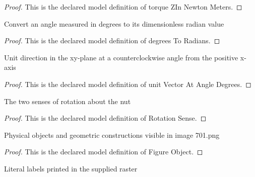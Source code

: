 \begin{proof}
  This is the declared model definition of torque ZIn Newton Meters.
\end{proof}
\begin{definition}
  \label{def:physics:phyx-mini-0701:phyxminiproblems-problemphyxmini0701-degreestoradians}
  Convert an angle measured in degrees to its dimensionless radian value
\end{definition}
\begin{proof}
  This is the declared model definition of degrees To Radians.
\end{proof}
\begin{definition}
  \label{def:physics:phyx-mini-0701:phyxminiproblems-problemphyxmini0701-unitvectoratangledegrees}
  Unit direction in the xy-plane at a counterclockwise angle from the positive x-axis
\end{definition}
\begin{proof}
  This is the declared model definition of unit Vector At Angle Degrees.
\end{proof}
\begin{definition}
  \label{def:physics:phyx-mini-0701:phyxminiproblems-problemphyxmini0701-rotationsense}
  The two senses of rotation about the nut
\end{definition}
\begin{proof}
  This is the declared model definition of Rotation Sense.
\end{proof}
\begin{definition}
  \label{def:physics:phyx-mini-0701:phyxminiproblems-problemphyxmini0701-figureobject}
  Physical objects and geometric constructions visible in image 701.png
\end{definition}
\begin{proof}
  This is the declared model definition of Figure Object.
\end{proof}
\begin{definition}
  \label{def:physics:phyx-mini-0701:phyxminiproblems-problemphyxmini0701-figurelabel}
  Literal labels printed in the supplied raster
\end{definition}
